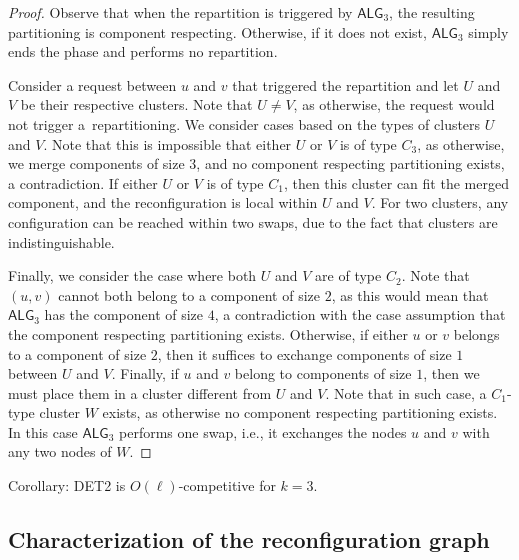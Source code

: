 \documentclass[manuscript,screen=true, review, anonymous]{acmart}
\newcommand{\TAlg}{{\ensuremath{\textsf{ALG}_{3}}}\xspace}
\begin{document}
\begin{proof}
    Observe that when the repartition is triggered by \TAlg, the resulting partitioning is component respecting.
  Otherwise, if it does not exist, \TAlg simply ends the phase and performs no repartition.

  
    Consider a request between $u$ and $v$ that triggered the repartition and let $U$ and $V$ be their respective clusters.
    Note that $U\neq V$,
	 as otherwise, the request would not trigger a~repartitioning.
	 We consider cases based on the types of clusters $U$ and $V$.
    Note that this is impossible that either $U$ or $V$ is of type $C_3$, as otherwise, we merge components of size $3$, and no component respecting partitioning exists, a contradiction.
    If either $U$ or $V$ is of type $C_1$, then this cluster can fit the merged component, and the reconfiguration is local within $U$ and $V$.
    For two clusters, any configuration can be reached within two swaps, due to the fact that clusters are indistinguishable.
  
    Finally, we consider the case where both $U$ and $V$ are of type $C_2$. Note that $(u,v)$ cannot both belong to a component of size $2$, as this would mean that \TAlg has the component of size $4$, a contradiction with the case assumption that the component respecting partitioning exists. 
    Otherwise, if either $u$ or $v$ belongs to a component of size $2$, then it suffices to exchange components of size $1$ between $U$ and $V$.
    Finally, if $u$ and $v$ belong to components of size $1$, then we must place them in a cluster different from $U$ and $V$.
    Note that in such case, a $C_1$-type cluster $W$ exists, as otherwise no component respecting partitioning exists. In this case \TAlg performs one swap, i.e., it exchanges the nodes $u$ and $v$ with any two nodes of $W$.
\end{proof}

Corollary: DET2 is $O(\ell)$-competitive for $k=3$.

\subsection{Characterization of the reconfiguration graph}
\end{document}

